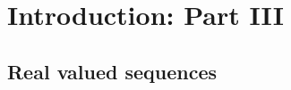 \chapter{Introduction: Part III}%
\label{cha:Introduction: Part III}
\section{Real valued sequences}%
\label{sec:Real valued sequences}



